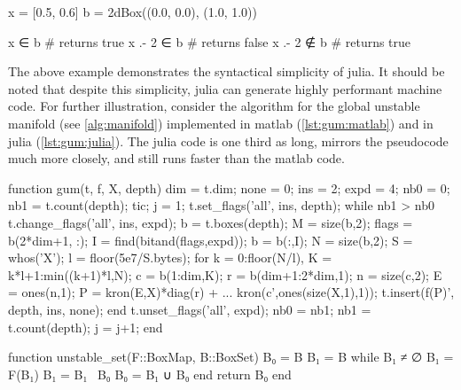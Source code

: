 \begin{minipage}{\linewidth}
\begin{jllisting}[language=julia, style=jlcodestyle]
    x = [0.5, 0.6]
    b = 2dBox((0.0, 0.0), (1.0, 1.0))

    x ∈ b           # returns true
    x .- 2 ∈ b      # returns false
    x .- 2 ∉ b      # returns true
\end{jllisting}
\end{minipage}

The above example demonstrates the syntactical simplicity of julia. 
It should be noted that despite this simplicity, julia can generate highly performant 
machine code. For further illustration, consider the algorithm for the global unstable 
manifold (see \autoref{alg:manifold}) implemented in matlab (\autoref{lst:gum:matlab}) 
and in julia (\autoref{lst:gum:julia}). The julia code is one third as long, mirrors 
the pseudocode much more closely, and still runs faster than the matlab code.

\begin{jllisting}[float, language=matlab, style=jlcodestyle, label=lst:gum:matlab, captionpos=b, caption=Unstable manifold algorithm in matlab]
    function gum(t, f, X, depth)
    dim = t.dim;
    none = 0; ins = 2; expd = 4;             %
    nb0 = 0;  nb1 = t.count(depth);          %
    tic; j = 1;
    t.set_flags('all', ins, depth);
    while nb1 > nb0                          %
    t.change_flags('all', ins, expd);        %
    b = t.boxes(depth); M = size(b,2);       %
    flags = b(2*dim+1, :); 
    I = find(bitand(flags,expd));            %
    b = b(:,I); N = size(b,2);
    S = whos('X'); l = floor(5e7/S.bytes);
    for k = 0:floor(N/l),                    %
        K = k*l+1:min((k+1)*l,N);
        c = b(1:dim,K);                      %
        r = b(dim+1:2*dim,1);                %
        n = size(c,2); E = ones(n,1);
        P = kron(E,X)*diag(r) + ...          %
            kron(c',ones(size(X,1),1));
        t.insert(f(P)', depth, ins, none);   %
    end
    t.unset_flags('all', expd);              %
    nb0 = nb1; nb1 = t.count(depth);
    j = j+1;
    end
\end{jllisting}

\begin{jllisting}[float, language=julia, style=jlcodestyle, label=lst:gum:julia, captionpos=b, caption=Unstable manifold algorithm in julia]
    function unstable_set(F::BoxMap, B::BoxSet)
        B₀ = B
        B₁ = B
        while B₁ ≠ ∅
            B₁ = F(B₁)
            B₁ = B₁ \ B₀
            B₀ = B₁ ∪ B₀
        end
        return B₀
    end
\end{jllisting}


